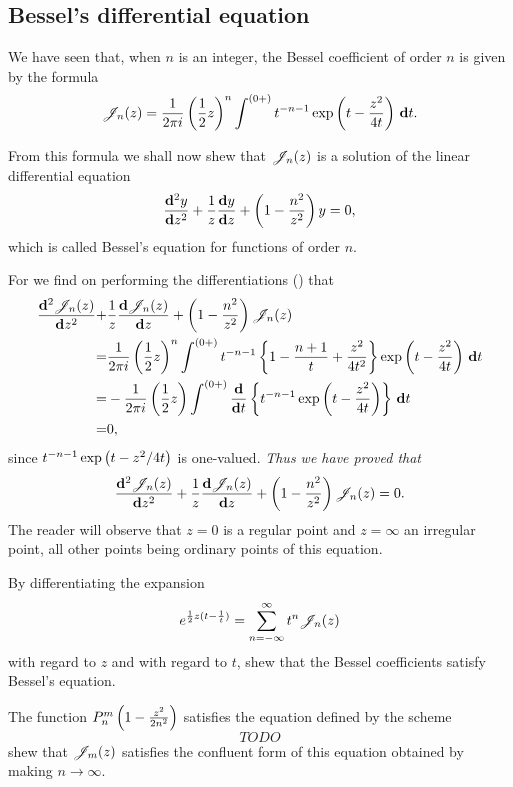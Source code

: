 \documentclass{book}
\begin{document}
\subsection{Bessel's differential equation}
We have seen that, when $n$ is an integer, the Bessel coefficient of
order $n$ is given by the formula
$$
\mathscr{J}_n(z)
=
\frac{1}{2\pi i} 
\left( \frac{1}{2} z \right)^n
\int^{(0+)}
t^{-n-1}
\exp\left(  t - \frac{z^2}{4t}   \right)
\, \mathbf{d} t.
$$

From this formula we shall now shew that $\mathscr{J}_n(z)$ is a solution of the
linear differential equation
$$
\frac{\mathbf{d}^2 y}{\mathbf{d} z^2}
+ \frac{1}{z} \frac{\mathbf{d} y}{\mathbf{d} z}
+ \left(  1 - \frac{n^2}{z^2}   \right) y
= 0,
$$
which is called Bessel's equation for functions of order $n$.

For we find on performing the differentiations 
() that
\begin{align*}
  \frac{\mathbf{d}^2 \mathscr{J}_n(z)}{\mathbf{d} z^2}
  +& \frac{1}{z} \frac{\mathbf{d} \mathscr{J}_n(z)}{\mathbf{d} z}
  + \left(  1 - \frac{n^2}{z^2}   \right) \mathscr{J}_n(z)
  \\
  =& 
  \frac{1}{2\pi i} 
  \left(  \frac{1}{2} z   \right)^n 
  \int^{(0+)}
  t^{-n-1}
  \left\{  1 - \frac{n+1}{t} + \frac{z^2}{4t^2}   \right\}
  \exp\left(  t - \frac{z^2}{4t}   \right)
  \, \mathbf{d} t \\
  =& 
  -\frac{1}{2\pi i}
  \left(  \frac{1}{2} z   \right)
  \int^{(0+)}
  \frac{\mathbf{d}}{\mathbf{d} t} \left\{  t^{-n-1} \exp\left(  t - \frac{z^2}{4t}   \right)
   \right\}
  \, \mathbf{d} t \\
  =& 0,
\end{align*}
since $t^{-n-1} \exp\left(  t - z^2/4t   \right)$ is one-valued.
\emph{Thus we have proved that }
$$
\frac{\mathbf{d}^2 \mathscr{J}_n(z)}{\mathbf{d} z^2}
+ \frac{1}{z} \frac{\mathbf{d} \mathscr{J}_n(z)}{\mathbf{d} z}
+ \left(  1 - \frac{n^2}{z^2}   \right) \mathscr{J}_n(z) 
= 0.
$$
The reader will observe that $z=0$ is a regular point and 
$z = \infty$ an irregular point, all other points being ordinary
points of this equation.
% 
% 
\begin{wandwexample}
  By differentiating the expansion
  $$
  e^{\frac{1}{2} z (t - \frac{1}{t})} = \sum_{n=-\infty}^{\infty} t^n \mathscr{J}_n(z)
  $$
  with regard to $z$ and with regard to $t$, shew that the Bessel
  coefficients satisfy Bessel's equation.
\end{wandwexample}
\begin{wandwexample}
  The function $P_n^m\left(  1 - \frac{z^2}{2n^2}   \right)$ satisfies the
  equation defined by the scheme
  $$
  TODO
  $$
  shew that $\mathscr{J}_m(z)$ satisfies the confluent form of this equation
  obtained by making $n \rightarrow \infty$.
\end{wandwexample}
\end{document}

